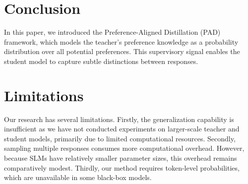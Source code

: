 \section{Conclusion}

In this paper, we introduced the Preference-Aligned Distillation (PAD) framework, which models the teacher's preference knowledge as a probability distribution over all potential preferences. This supervisory signal enables the student model to capture subtle distinctions between responses. 

\section*{Limitations}
Our research has several limitations. Firstly, the generalization capability is insufficient as we have not conducted experiments on larger-scale teacher and student models, primarily due to limited computational resources. Secondly, sampling multiple responses consumes more computational overhead. However, because SLMs have relatively smaller parameter sizes, this overhead remains comparatively modest.
Thirdly, our method requires token-level probabilities, which are unavailable in some black-box models. 
